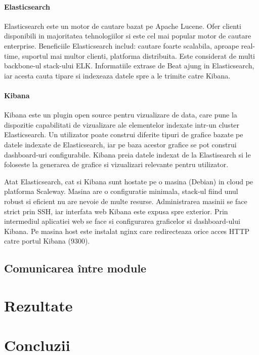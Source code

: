 \documentclass[12pt]{report}
\begin{document}
			\subsubsection{Elasticsearch}
Elasticsearch este un motor de cautare bazat pe Apache Lucene. Ofer clienti disponibili in majoritatea tehnologiilor si este cel mai popular motor de cautare enterprise. Beneficiile Elasticsearch includ: cautare foarte scalabila, aproape real-time, suportul mai multor clienti, platforma distribuita. Este considerat de multi backbone-ul stack-ului ELK. Informatiile extrase de Beat ajung in Elasticsearch, iar acesta cauta tipare si indexeaza datele spre a le trimite catre Kibana.


			\subsubsection{Kibana}
Kibana este un plugin open source pentru vizualizare de data, care pune la dispozitie capabilitati de vizualizare ale elementelor indexate intr-un cluster Elasticsearch. Un utilizator poate  construi diferite tipuri de grafice bazate pe datele indexate de Elasticsearch, iar pe baza acestor grafice se pot construi dashboard-uri configurabile. Kibana preia datele indexat de la Elastisearch si le foloseste la generarea de grafice si vizualizari relevante pentru utilizator.

Atat Elasticsearch, cat si Kibana sunt hostate pe o masina (Debian) in cloud pe platforma Scaleway. Masina are o configuratie minimala, stack-ul fiind unul robust si eficient nu are nevoie de multe resurse. Administrarea masinii se face strict prin SSH, iar interfata web Kibana este expusa spre exterior. Prin intermediul aplicatiei web se face si configurarea graficelor si dashboard-ului Kibana. Pe masina host este instalat nginx care redirecteaza orice acces HTTP catre portul Kibana (9300).
	\section{Comunicarea între module}

\chapter{Rezultate}

\chapter{Concluzii}
\end{document}
